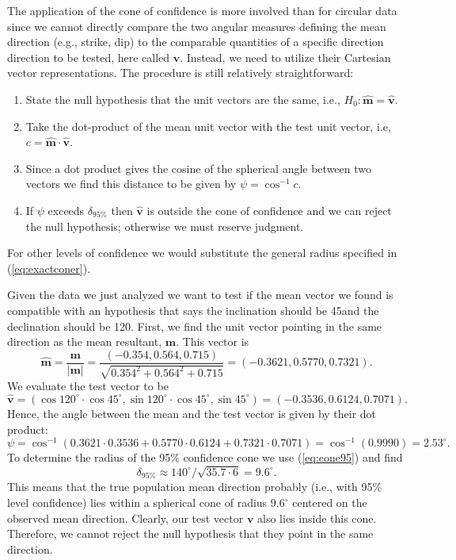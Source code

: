 The application of the cone of confidence is more involved than
for circular data since we cannot directly compare the two angular measures defining the mean direction (e.g., strike, dip) to the
comparable quantities of a specific direction direction to be tested, here called $\mathbf{\hat{v}}$.
Instead, we need to utilize their Cartesian vector representations.  The procedure is still relatively straightforward:
\begin{enumerate}
	\item State the null hypothesis that the unit vectors are the same, i.e., $H_0: \mathbf{\hat{m}} = \mathbf{\hat{v}}$.
	\item Take the dot-product of the mean unit vector with the test unit vector, i.e, $c = \mathbf{\hat{m}} \cdot \mathbf{\hat{v}}$.
	\item Since a dot product gives the cosine of the spherical angle between two vectors we find this distance
	to be given by $\psi = \cos^{-1} c$.
	\item If $\psi$ exceeds $\delta_{95\%}$ then $\mathbf{\hat{v}}$ is outside the cone of confidence and we can reject
	the null hypothesis; otherwise we must reserve judgment.
\end{enumerate}
For other levels of confidence we would substitute the general radius specified in (\ref{eq:exactconer}).
\begin{example}
Given the data we just analyzed we want to test if the mean vector we found is compatible with an hypothesis
that says the inclination should be 45\DS and the declination should be 120\DS.  First, we find the
unit vector pointing in the same direction as the mean resultant, $\mathbf{m}$.  This vector is
\begin{equation}
	\mathbf{\hat{m}} = \frac{\mathbf{m}}{|\mathbf{m}|} = \frac{(-0.354, 0.564, 0.715)}{\sqrt{0.354^2 + 0.564^2 + 0.715}} = (-0.3621, 0.5770, 0.7321).
\end{equation}
We evaluate the test vector to be
\begin{equation}
	\mathbf{\hat{v}} = (\cos 120^{\circ} \cdot \cos 45^{\circ}, \sin 120^{\circ} \cdot \cos 45^{\circ}, \sin 45^{\circ}) = (-0.3536, 0.6124, 0.7071).
\end{equation}
Hence, the angle between the mean and the test vector is given by their dot product:
\begin{equation}
	\psi = \cos^{-1} \left (0.3621 \cdot 0.3536 + 0.5770 \cdot 0.6124 + 0.7321 \cdot 0.7071 \right ) = \cos^{-1} (0.9990) = 2.53^{\circ}.
\end{equation}
To determine the  radius of the 95\% confidence cone we use (\ref{eq:cone95}) and find
\begin{equation}
\delta_{95\%} \approx 140^{\circ} / \sqrt{ 35.7 \cdot 6 } = 9.6^{\circ}.
\end{equation}	 
This means that the true population mean direction probably (i.e., with 95\% level confidence) lies within a spherical cone of 
radius $9.6^{\circ}$ centered on the observed mean direction.  Clearly, our test vector $\mathbf{v}$ also lies inside this cone.
Therefore, we cannot reject the null hypothesis that they point in the same direction.
\end{example}

